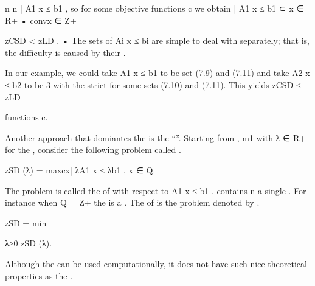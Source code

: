 n
n
| A1 x ≤ b1 , so for some objective functions c we obtain
| A1 x ≤ b1  ⊂ x ∈ R+
• convx ∈ Z+

zCSD < zLD .
• The sets of  Ai x ≤ bi are simple to deal with separately; that is, the difficulty is caused
by their .

In our example, we could take A1 x ≤ b1 to be  set (7.9) and (7.11) and take A2 x ≤ b2 to be
3
with the  strict for some  sets (7.10) and (7.11). This yields zCSD ≤ zLD

functions c.

Another approach that domiantes the  is the ``''. Starting from ,
m1
with  λ ∈ R+
for the , consider the following problem called .

zSD (λ) = max{cx| λA1 x ≤ λb1 , x ∈ Q}.

The problem  is called the  of  with respect to A1 x ≤ b1 .  contains
n
a single . For instance when Q = Z+
the  is a . The  of  is the problem denoted by .

zSD = min

λ≥0 zSD (λ).

Although the  can be used computationally, it does not have such nice theoretical properties as the .

